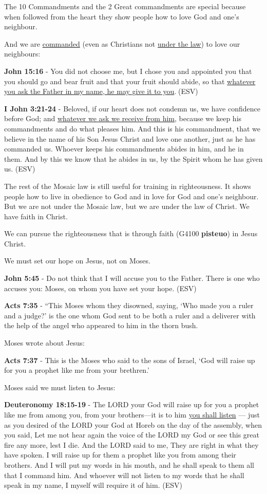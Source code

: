 \documentclass[11pt]{article}
\begin{document}
The 10 Commandments and the 2 Great commandments are special because when followed from the heart they show people how to love God and one's neighbour.

And we are \uline{commanded} (even as Christians not \uline{under the law}) to love our neighbours:

\textbf{John 15:16} - You did not choose me, but I chose you and appointed you that you should go and bear fruit and that your fruit should abide, so that \uline{whatever you ask the Father in my name, he may give it to you}.􀀂(ESV)

\textbf{I John 3:21-24} - Beloved, if our heart does not condemn us, we have confidence before God; and \uline{whatever we ask we receive from him}, because we keep his commandments and do what pleases him. And this is his commandment, that we believe in the name of his Son Jesus Christ and love one another, just as he has commanded us. Whoever keeps his commandments abides in him, and he in them. And by this we know that he abides in us, by the Spirit whom he has given us. (ESV)

The rest of the Mosaic law is still useful for training in righteousness. It shows people how to live in obedience to God and in love for God and one's neighbour. But we are not under the Mosaic law, but we are under the law of Christ. We have faith in Christ.

We can pursue the righteousness that is through faith (G4100 \textbf{pisteuo}) in Jesus Christ.

We must set our hope on Jesus, not on Moses.

\textbf{John 5:45} -  Do not think that I will accuse you to the Father.  There is one who accuses you: Moses, on whom you have set your hope.  (ESV)

\textbf{Acts 7:35} - “This Moses whom they disowned, saying, ‘Who made you a ruler and a judge?’ is the one whom God sent to be both a ruler and a deliverer with the help of the angel who appeared to him in the thorn bush.

Moses wrote about Jesus:

\textbf{Acts 7:37} - This is the Moses who said to the sons of Israel, ‘God will raise up for you a prophet like me from your brethren.’

Moses said we must listen to Jesus:

\textbf{Deuteronomy 18:15-19} - The LORD your God will raise up for you a prophet like me from among you, from your brothers—it is to him \uline{you shall listen} — just as you desired of the LORD your God at Horeb on the day of the assembly, when you said, Let me not hear again the voice of the LORD my God or see this great fire any more, lest I die. And the LORD said to me, They are right in what they have spoken. I will raise up for them a prophet like you from among their brothers. And I will put my words in his mouth, and he shall speak to them all that I command him. And whoever will not listen to my words that he shall speak in my name, I myself will require it of him. (ESV)
\end{document}
